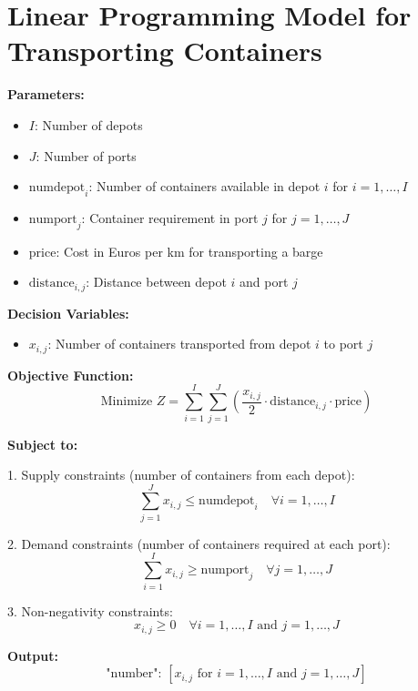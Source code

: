 \documentclass{article}
\begin{document}
\section*{Linear Programming Model for Transporting Containers}

\textbf{Parameters:}
\begin{itemize}
    \item \( I \): Number of depots
    \item \( J \): Number of ports
    \item \( \text{numdepot}_i \): Number of containers available in depot \( i \) for \( i = 1, \ldots, I \)
    \item \( \text{numport}_j \): Container requirement in port \( j \) for \( j = 1, \ldots, J \)
    \item \( \text{price} \): Cost in Euros per km for transporting a barge
    \item \( \text{distance}_{i,j} \): Distance between depot \( i \) and port \( j \)
\end{itemize}

\textbf{Decision Variables:}
\begin{itemize}
    \item \( x_{i,j} \): Number of containers transported from depot \( i \) to port \( j \)
\end{itemize}

\textbf{Objective Function:}
\[
\text{Minimize } Z = \sum_{i=1}^{I} \sum_{j=1}^{J} \left( \frac{x_{i,j}}{2} \cdot \text{distance}_{i,j} \cdot \text{price} \right)
\]

\textbf{Subject to:}

1. Supply constraints (number of containers from each depot):
\[
\sum_{j=1}^{J} x_{i,j} \leq \text{numdepot}_i \quad \forall i = 1, \ldots, I
\]

2. Demand constraints (number of containers required at each port):
\[
\sum_{i=1}^{I} x_{i,j} \geq \text{numport}_j \quad \forall j = 1, \ldots, J
\]

3. Non-negativity constraints:
\[
x_{i,j} \geq 0 \quad \forall i = 1, \ldots, I \text{ and } j = 1, \ldots, J
\]

\textbf{Output:}
\[
\text{"number": } \left[ x_{i,j} \text{ for } i=1,\ldots,I \text{ and } j=1,\ldots,J \right]
\]
\end{document}

